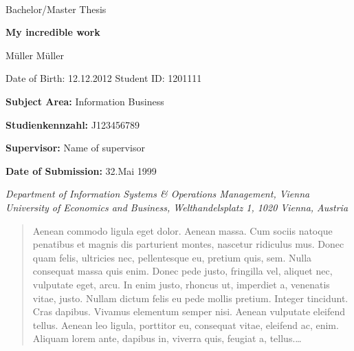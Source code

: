 \documentclass[a4paper, 12pt, twppages]{article}
\newcommand\BackgroundPic{%
\put(0,0){%
\parbox[b][\paperheight]{\paperwidth}{%
\vfill
\centering
\texttt{[image: background.pdf]}%
\vfill
}}}
\begin{document}

\pagebreak

\AddToShipoutPicture*{\BackgroundPic}
\thispagestyle{fancy}

{\vspace{2cm}~}
{\vspace{2cm}}

{\noindent\large Bachelor/Master Thesis}


\vspace{1cm}

{\noindent\huge\textbf{My incredible work}}

\bigskip

{\noindent\LARGE M\"uller M\"uller}

\bigskip
{\noindent\small Date of Birth: 12.12.2012}\newline
{\noindent\small Student ID: 1201111}

\bigskip
{\vspace{2cm}}
{\noindent\large {\bf Subject Area:} Information Business}

\bigskip
{\noindent\large {\bf Studienkennzahl:} J123456789}

\bigskip


{\noindent\large {\bf Supervisor:} Name of supervisor}

\bigskip

{\noindent\large {\bf Date of Submission:} 32.Mai 1999}

\bigskip\bigskip\bigskip\bigskip\bigskip\bigskip

{\em\noindent Department of Information Systems \& Operations Management, Vienna University of
Economics and Business, Welthandelsplatz 1, 1020 Vienna, Austria
}


\pagebreak
\tableofcontents
\pagebreak
\listoffigures
\pagebreak
\listoftables
\pagebreak


\begin{abstract}

Aenean commodo ligula eget dolor. Aenean massa. Cum sociis natoque penatibus et magnis dis parturient montes, nascetur ridiculus mus. Donec quam felis, ultricies nec, pellentesque eu, pretium quis, sem. Nulla consequat massa quis enim. Donec pede justo, fringilla vel, aliquet nec, vulputate eget, arcu. In enim justo, rhoncus ut, imperdiet a, venenatis vitae, justo. Nullam dictum felis eu pede mollis pretium. Integer tincidunt. Cras dapibus. Vivamus elementum semper nisi. Aenean vulputate eleifend tellus. Aenean leo ligula, porttitor eu, consequat vitae, eleifend ac, enim. Aliquam lorem ante, dapibus in, viverra quis, feugiat a, tellus.\dots
\end{abstract}

\pagebreak






\end{document}
